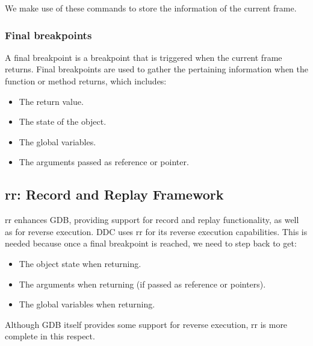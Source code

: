 We make use of these commands to store the information of the current frame.
\subsubsection{Final breakpoints}
A final breakpoint is a breakpoint that is triggered when the current frame returns. Final breakpoints are used to gather the pertaining information when the function or method returns, which includes:
\begin{itemize}
    \item The return value.
    \item The state of the object.
    \item The global variables.
    \item The arguments passed as reference or pointer.
\end{itemize}

\subsection{rr: Record and Replay Framework}

rr \cite{rr} enhances GDB, providing support for record and replay functionality, as well as for reverse execution.
%
DDC uses rr for its reverse execution capabilities. This is needed because once a final breakpoint is reached, we need to step back to get:
\begin{itemize}
    \item The object state when returning.
    \item The arguments when returning (if passed as reference or pointers).
    \item The global variables when returning.
\end{itemize}
Although GDB itself provides some support for reverse execution, rr is more complete in this respect.
